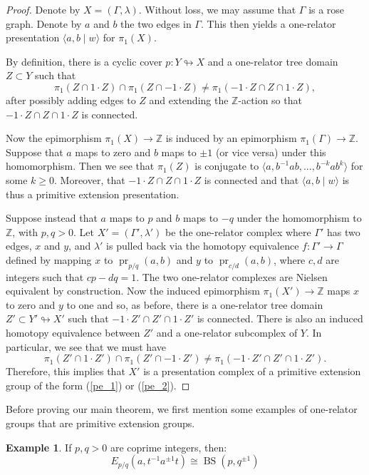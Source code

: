 \documentclass[11pt, a4paper]{amsart}
\theoremstyle{definition}
\newtheorem{example}[theorem]{Example}
\newcommand{\isom}{\cong}
\newcommand{\Z}{\mathbb{Z}}
\def\immerses{\looparrowright}
\DeclareMathOperator{\pr}{pr}
\DeclareMathOperator{\bs}{BS}
\begin{document}
\begin{proof}
Denote by $X = (\Gamma, \lambda)$. Without loss, we may assume that $\Gamma$ is a rose graph. Denote by $a$ and $b$ the two edges in $\Gamma$. This then yields a one-relator presentation $\langle a, b \mid w\rangle$ for $\pi_1(X)$. 


By definition, there is a cyclic cover $p:Y\immerses X$ and a one-relator tree domain $Z\subset Y$ such that
\[
\pi_1(Z\cap 1\cdot Z)\cap \pi_1(Z\cap -1\cdot Z)\neq \pi_1(-1\cdot Z\cap Z\cap 1\cdot Z),
\]
after possibly adding edges to $Z$ and extending the $\Z$-action so that $-1\cdot Z\cap Z\cap 1\cdot Z$ is connected. 

Now the epimorphism $\pi_1(X)\to \Z$ is induced by an epimorphism $\pi_1(\Gamma)\to \Z$. Suppose that $a$ maps to zero and $b$ maps to $\pm1$ (or vice versa) under this homomorphism. Then we see that $\pi_1(Z)$ is conjugate to $\langle a, b^{-1}ab, ..., b^{-k}ab^k\rangle$ for some $k\geq 0$. Moreover, that $-1\cdot Z\cap Z\cap 1\cdot Z$ is connected and that $\langle a, b\mid w\rangle$ is thus a primitive extension presentation.

Suppose instead that $a$ maps to $p$ and $b$ maps to $-q$ under the homomorphism to $\Z$, with $p, q>0$. Let $X' = (\Gamma', \lambda')$ be the one-relator complex where $\Gamma'$ has two edges, $x$ and $y$, and $\lambda'$ is pulled back via the homotopy equivalence $f:\Gamma'\to \Gamma$ defined by mapping $x$ to $\pr_{p/q}(a, b)$ and $y$ to $\pr_{c/d}(a, b)$, where $c, d$ are integers such that $cp - dq = 1$. The two one-relator complexes are Nielsen equivalent by construction. Now the induced epimorphism $\pi_1(X')\to \Z$ maps $x$ to zero and $y$ to one and so, as before, there is a one-relator tree domain $Z'\subset Y'\immerses X'$ such that $-1\cdot Z'\cap Z'\cap 1\cdot Z'$ is connected. There is also an induced homotopy equivalence between $Z'$ and a one-relator subcomplex of $Y$. In particular, we see that we must have
\[
\pi_1(Z'\cap 1\cdot Z')\cap \pi_1(Z'\cap -1\cdot Z')\neq \pi_1(-1\cdot Z'\cap Z'\cap 1\cdot Z').
\]
Therefore, this implies that $X'$ is a presentation complex of a primitive extension group of the form (\ref{pe_1}) or (\ref{pe_2}).
\end{proof}

Before proving our main theorem, we first mention some examples of one-relator groups that are primitive extension groups.

\begin{example}
If $p, q> 0$ are coprime integers, then:
\[
E_{p/q}(a, t^{-1}a^{\pm1}t) \isom \bs(p, q^{\pm1})
\]
\end{example}
\end{document}
